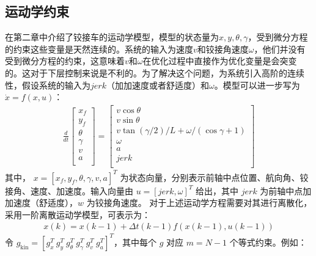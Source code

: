 \documentclass[master,academic]{ysuthesis} %
\begin{document}
		\subsection{运动学约束}
		在第二章中介绍了铰接车的运动学模型，模型的状态量为$x,y,\theta,\gamma$，受到微分方程的约束这些变量是天然连续的。系统的输入为速度$v$和铰接角速度$\omega$，他们并没有受到微分方程的约束，这意味着$v$和$\omega$在优化过程中直接作为优化变量是会突变的。这对于下层控制来说是不利的。为了解决这个问题，为系统引入高阶的连续性，假设系统的输入为$jerk$（加加速度或者舒适度）和$\omega$。模型可以进一步写为$\dot{x}=f( x,u )$：
		\begin{equation}
			\begin{aligned}
				 \frac{d}{dt}\left[ \begin{array}{c}
					x_f\\
					y_f\\
					\theta\\
					\gamma\\
					v\\
					a\\
				\end{array} \right] =\left[ \begin{array}{c}
					v\cos\theta\\
					v\sin\theta\\
					v\tan( \gamma /2 ) /L+\omega / (\cos\gamma +1 )\\
					\omega\\
					a\\
					jerk\\
				\end{array} \right] 
			\end{aligned}   
		\end{equation}
		其中， $x=\left[ x_f,y_f,\theta,\gamma,v,a \right]^T$ 为状态向量，分别表示前轴中点位置、航向角、铰接角、速度、加速度。输入向量由 $u=\left[jerk,\omega\right]^T$ 给出，其中 $jerk$ 为前轴中点加加速度（舒适度），$w$ 为铰接角速度。
		对于上述运动学方程需要对其进行离散化，采用一阶离散运动学模型，可表示为：
		\begin{equation}
			\begin{aligned}
				x( k ) =x( k-1 ) +\Delta t( k-1 ) f( x( k-1 ) ,u( k-1 ) ) 
			\end{aligned}   
		\end{equation}
		令 \(g_{\text{kin}} = [g_x^T\ g_y^T\ g_\theta^T\ g_\gamma^T\ g_v^T\ g_a^T]^T\)，其中每个 \(g\) 对应 \(m = N-1\) 个等式约束。例如：
\end{document}
